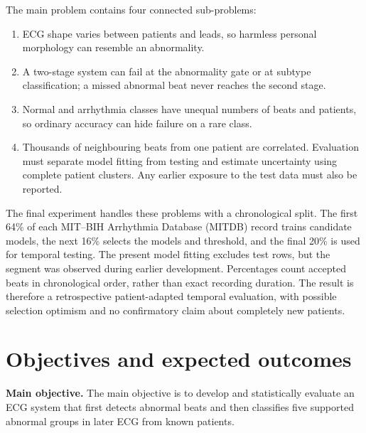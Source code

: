 The main problem contains four connected sub-problems:
\begin{enumerate}
    \item ECG shape varies between patients and leads, so harmless personal
    morphology can resemble an abnormality.
    \item A two-stage system can fail at the abnormality gate or at subtype
    classification; a missed abnormal beat never reaches the second stage.
    \item Normal and arrhythmia classes have unequal numbers of beats and
    patients, so ordinary accuracy can hide failure on a rare class.
    \item Thousands of neighbouring beats from one patient are correlated.
    Evaluation must separate model fitting from testing and estimate uncertainty
    using complete patient clusters. Any earlier exposure to the test data
    must also be reported.
\end{enumerate}

The final experiment handles these problems with a chronological split. The
first 64\% of each MIT--BIH Arrhythmia Database (MITDB) record trains candidate models, the next 16\% selects
the models and threshold, and the final 20\% is used for temporal testing.
The present model fitting excludes test rows, but the segment was observed
during earlier development. Percentages count accepted beats in chronological
order, rather than exact recording duration. The result is therefore a
retrospective patient-adapted temporal evaluation, with possible selection
optimism and no confirmatory claim about completely new patients.

\section{Objectives and expected outcomes}

\textbf{Main objective.}
The main objective is to develop and statistically evaluate an ECG
system that first detects abnormal beats and then classifies five supported
abnormal groups in later ECG from known patients.

